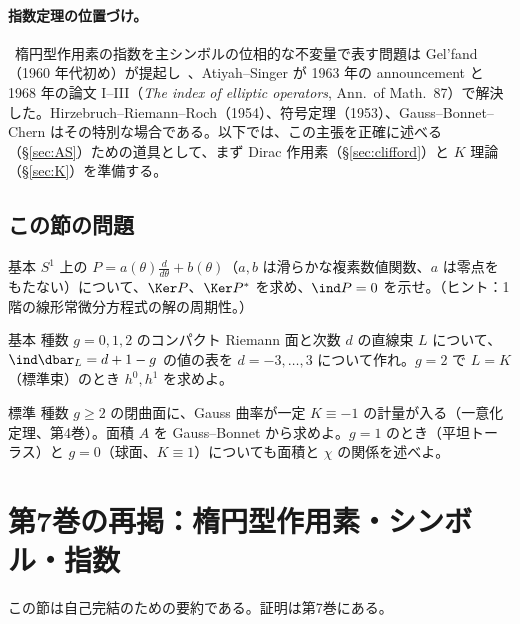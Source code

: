 \paragraph{指数定理の位置づけ。}\tC\ 楕円型作用素の指数を主シンボルの位相的な不変量で表す問題は Gel'fand（1960 年代初め）が提起し\tQ\ 、Atiyah--Singer が 1963 年の announcement と 1968 年の論文 I--III（\emph{The index of elliptic operators}, Ann.\ of Math.\ 87）で解決した。Hirzebruch--Riemann--Roch（1954）、符号定理（1953）、Gauss--Bonnet--Chern はその特別な場合である。以下では、この主張を正確に述べる（\S\ref{sec:AS}）ための道具として、まず Dirac 作用素（\S\ref{sec:clifford}）と $K$ 理論（\S\ref{sec:K}）を準備する。

\subsection*{この節の問題}
\begin{prob}{基本}\label{p:S1ind}
$S^1$ 上の $P=a(\theta)\frac d{d\theta}+b(\theta)$（$a,b$ は滑らかな複素数値関数、$a$ は零点をもたない）について、$\Ker P$、$\Ker P^*$ を求め、$\ind P=0$ を示せ。（ヒント：1 階の線形常微分方程式の解の周期性。）
\end{prob}
\begin{prob}{基本}\label{p:RS}
種数 $g=0,1,2$ のコンパクト Riemann 面と次数 $d$ の直線束 $L$ について、$\ind\dbar_L=d+1-g$ の値の表を $d=-3,\dots,3$ について作れ。$g=2$ で $L=K$（標準束）のとき $h^0,h^1$ を求めよ。
\end{prob}
\begin{prob}{標準}\label{p:GBsurf}
種数 $g\ge2$ の閉曲面に、Gauss 曲率が一定 $K\equiv-1$ の計量が入る（一意化定理、第4巻）。面積 $A$ を Gauss--Bonnet から求めよ。$g=1$ のとき（平坦トーラス）と $g=0$（球面、$K\equiv1$）についても面積と $\chi$ の関係を述べよ。
\end{prob}

\section{第7巻の再掲：楕円型作用素・シンボル・指数}\label{sec:recall}
この節は自己完結のための要約である。証明は第7巻にある。
